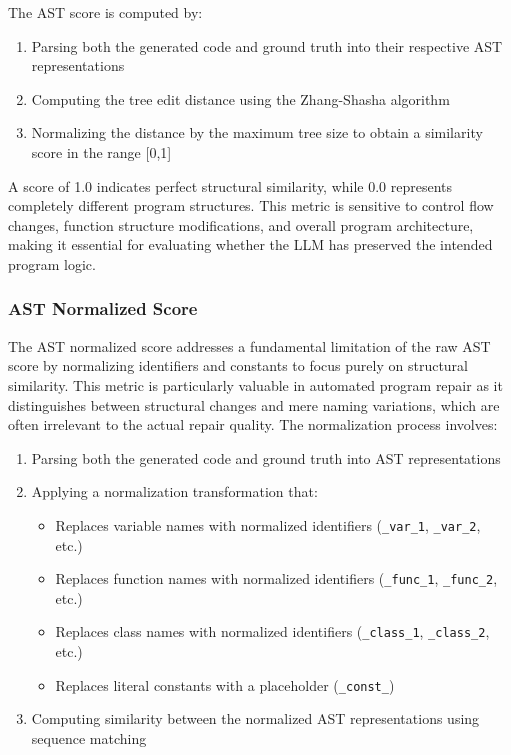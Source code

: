 The AST score is computed by:
\begin{enumerate}
    \item Parsing both the generated code and ground truth into their respective AST representations
    \item Computing the tree edit distance using the Zhang-Shasha algorithm \cite{zhang1989simple}
    \item Normalizing the distance by the maximum tree size to obtain a similarity score in the range [0,1]
\end{enumerate}

A score of 1.0 indicates perfect structural similarity, while 0.0 represents completely different program structures. This metric is sensitive to control flow changes, function structure modifications, and overall program architecture, making it essential for evaluating whether the LLM has preserved the intended program logic.

\subsubsection{AST Normalized Score}
The AST normalized score addresses a fundamental limitation of the raw AST score by normalizing identifiers and constants to focus purely on structural similarity. This metric is particularly valuable in automated program repair as it distinguishes between structural changes and mere naming variations, which are often irrelevant to the actual repair quality.
The normalization process involves:
\begin{enumerate}
    \item Parsing both the generated code and ground truth into AST representations
    \item Applying a normalization transformation that:
        \begin{itemize}
            \item Replaces variable names with normalized identifiers (\texttt{\_var\_1}, \texttt{\_var\_2}, etc.)
            \item Replaces function names with normalized identifiers (\texttt{\_func\_1}, \texttt{\_func\_2}, etc.)
            \item Replaces class names with normalized identifiers (\texttt{\_class\_1}, \texttt{\_class\_2}, etc.)
            \item Replaces literal constants with a placeholder (\texttt{\_const\_})
        \end{itemize}
    \item Computing similarity between the normalized AST representations using sequence matching
\end{enumerate}

